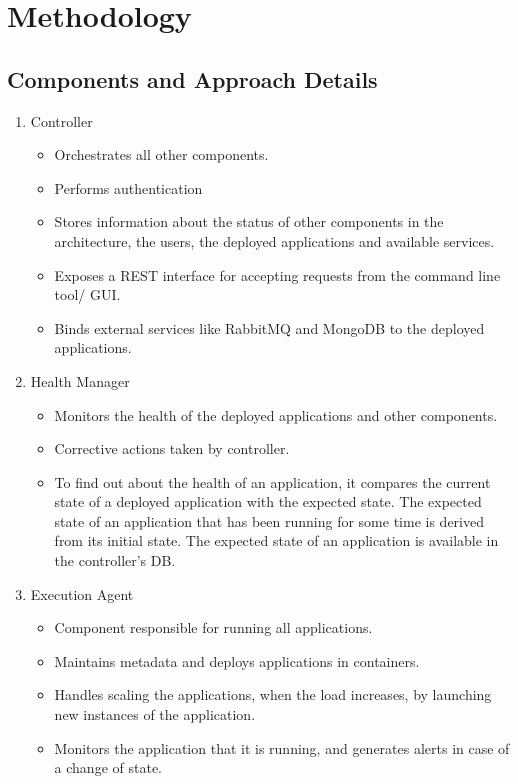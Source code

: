 \documentclass[a4paper]{article}
\begin{document}
  \section{Methodology}
  
  \subsection{Components and Approach Details}
  \begin{enumerate}
	  \item Controller
	  \begin{itemize}
		  \item Orchestrates all other components.
		  \item Performs authentication
		  \item Stores information about the status of other components in the architecture, the users, the deployed applications and available services.
		  \item Exposes a REST interface for accepting requests from the command line tool/ GUI.
		  \item Binds external services like RabbitMQ and MongoDB to the deployed applications.
	  \end{itemize}
	  \item Health Manager
	  \begin{itemize}
		  \item Monitors the health of the deployed applications and other components.
		  \item Corrective actions taken by controller.
		  \item To find out about the health of an application, it compares the current state of a deployed application with the expected state. The expected state of an application that has been running for some time is derived from its initial state. The expected state of an application is available in the controller’s DB.
	  \end{itemize}
	  \item Execution Agent
	  \begin{itemize}
		  \item Component responsible for running all applications.
		  \item Maintains metadata and deploys applications in containers.
		  \item Handles scaling the applications, when the load increases, by launching new instances of the application.
		  \item Monitors the application that it is running, and generates alerts in case of a change of state.

\end{itemize}
\end{enumerate}
\end{document}
